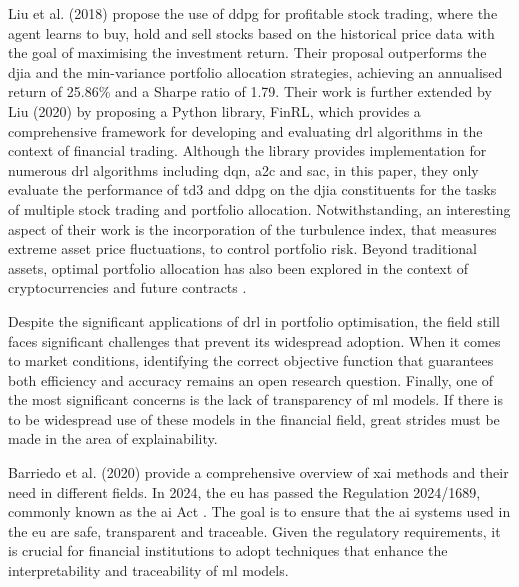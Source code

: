 Liu et al. (2018) \cite{Liu2018} propose the use of \acrshort{ddpg} for profitable stock trading, where the agent learns to buy, hold and sell stocks based on the historical price data with the goal of maximising the investment return. Their proposal outperforms the \acrfull{djia} and the min-variance portfolio allocation strategies, achieving an annualised return of 25.86\% and a Sharpe ratio of 1.79. Their work is further extended by Liu (2020) \cite{Liu2020} by proposing a Python library, FinRL, which provides a comprehensive framework for developing and evaluating \acrshort{drl} algorithms in the context of financial trading. Although the library provides implementation for numerous \acrshort{drl} algorithms including \acrshort{dqn}, \acrshort{a2c} and \acrshort{sac}, in this paper, they only evaluate the performance of \acrshort{td3} and \acrshort{ddpg} on the \acrfull{djia} constituents for the tasks of multiple stock trading and portfolio allocation. Notwithstanding, an interesting aspect of their work is the incorporation of the turbulence index, that measures extreme asset price fluctuations, to control portfolio risk. Beyond traditional assets, optimal portfolio allocation has also been explored in the context of cryptocurrencies \cite{Jiang2016} and future contracts \cite{Zhang2019}.

Despite the significant applications of \acrshort{drl} in portfolio optimisation, the field still faces significant challenges that prevent its widespread adoption. When it comes to market conditions, identifying the correct objective function that guarantees both efficiency and accuracy remains an open research question. Finally, one of the most significant concerns is the lack of transparency of \acrshort{ml} models. If there is to be widespread use of these models in the financial field, great strides must be made in the area of explainability.

Barriedo et al. (2020) \cite{BarredoArrieta2019} provide a comprehensive overview of \acrfull{xai} methods and their need in different fields. In 2024, the \acrlong{eu} has passed the Regulation 2024/1689, commonly known as the \acrshort{ai} Act \cite{AIAct2024}. The goal is to ensure that the \acrshort{ai} systems used in the \acrlong{eu} are safe, transparent and traceable. Given the regulatory requirements, it is crucial for financial institutions to adopt techniques that enhance the interpretability and traceability of \acrshort{ml} models.

